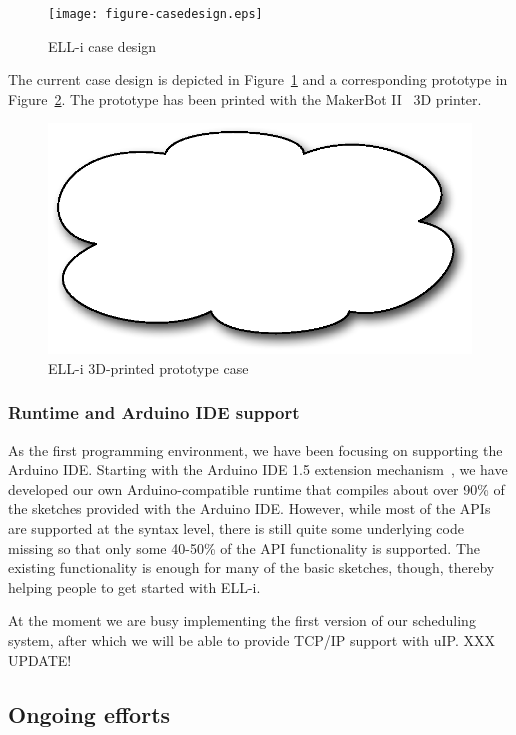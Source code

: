 \documentclass[draft,a4paper]{siamltex}
\begin{document}
\begin{figure}
\centering
\texttt{[image: figure-casedesign.eps]}
\caption{ELL-i case design}
\label{fig:casedesign}
\end{figure}

The current case design is depicted in Figure~\ref{fig:casedesign} and
a corresponding prototype in Figure~\ref{fig:case}.  The prototype has
been printed with the MakerBot II~\cite{MakerBotII} 3D printer.

\begin{figure}
\centering
\includegraphics[scale=.4]{figure-case.eps}
\caption{ELL-i 3D-printed prototype case}
\label{fig:case}
\end{figure}


\subsubsection{Runtime and Arduino IDE support}

As the first programming environment, we have been focusing on
supporting the Arduino IDE.  Starting with the Arduino IDE 1.5
extension mechanism~\cite{ArduinoIDEextension}, we have developed our
own Arduino-compatible runtime that compiles about over 90\% of the
sketches provided with the Arduino IDE.  However, while most of the
APIs are supported at the syntax level, there is still quite some
underlying code missing so that only some 40-50\% of the API
functionality is supported.  The existing functionality is enough for
many of the basic sketches, though, thereby helping people to get
started with ELL-i.

At the moment we are busy implementing the first version of our
scheduling system, after which we will be able to provide TCP/IP
support with uIP.  XXX UPDATE!

\subsection{Ongoing efforts}
\end{document}
